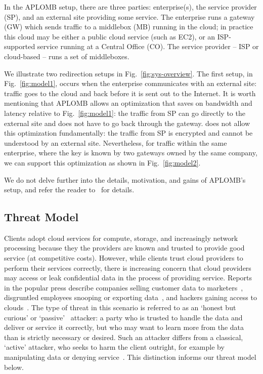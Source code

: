 In the APLOMB setup, there are three parties: enterprise(s), the service provider (SP), and an external site providing
some service. The enterprise runs a gateway (GW) which sends traffic to a middlebox (MB) running in the cloud; in practice this cloud may be either a public cloud service (such as EC2), or an ISP-supported service running at a Central Office (CO).
The service provider -- ISP or cloud-based -- runs a set of middleboxes. 

We illustrate two redirection setups in Fig.~\ref{fig:sys-overview}.  The first setup, in Fig.~\ref{fig:model1},  occurs when the enterprise communicates with an external site: traffic goes to the cloud and back before it is sent out to the Internet. 
It is worth mentioning that APLOMB allows an optimization that saves on bandwidth and latency relative to Fig.~\ref{fig:model1}: the traffic from SP can go directly to the external site and does not have to go back through the gateway. \sys does not allow this optimization fundamentally: the traffic from SP is encrypted and cannot be understood by an external site. 
Nevertheless, for traffic within the same enterprise, where the key is known by two gateways owned by the same company, we can support this optimization as shown in Fig.~\ref{fig:model2}.


We do not delve further into the details, motivation, and gains of APLOMB's setup, and refer the reader to~\cite{aplomb} for details. 

\subsection{Threat Model}
  Clients adopt cloud services for compute, storage, and increasingly network processing because they the providers are known and trusted to provide good service (at competitive costs). 
  However, while clients trust cloud providers to perform their services correctly, there is increasing concern that cloud providers may access or leak confidential data in the process of providing service.
  Reports in the popular press describe companies selling customer data to marketers~\cite{radioshack}, disgruntled employees snooping or exporting data~\cite{att}, and hackers gaining access to clouds~\cite{databreach,PrivacyRecords}.
  The type of threat in this scenario is referred to as an `honest but curious' or `passive'~\cite{goodrich} attacker: a party who is trusted to handle the data and deliver or service it correctly, but who may want to learn more from the data than is strictly necessary or desired.
  Such an attacker differs from a classical, `active' attacker, who seeks to harm the client outright, for example by manipulating data or denying service~\cite{goodrich}.
  This distinction informs our threat model below. 

